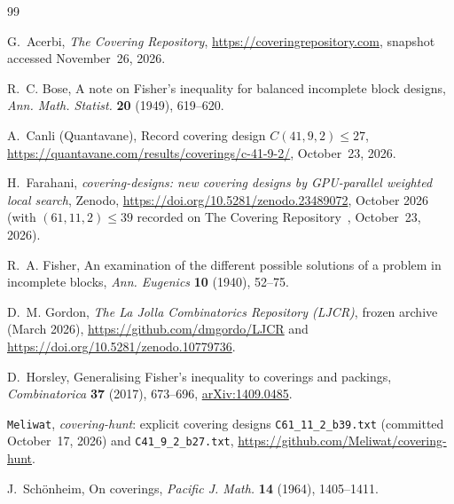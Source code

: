 \documentclass[11pt,a4paper]{article}
\theoremstyle{definition}
\theoremstyle{remark}
\begin{document}
\begin{thebibliography}{99}

G.~Acerbi, \emph{The Covering Repository}, \url{https://coveringrepository.com}, snapshot accessed November~26, 2026.

R.~C. Bose, A note on Fisher's inequality for balanced incomplete block designs, \emph{Ann. Math. Statist.} \textbf{20} (1949), 619--620.

A.~Canli (Quantavane), Record covering design $C(41,9,2) \le 27$, \url{https://quantavane.com/results/coverings/c-41-9-2/}, October~23, 2026.

H.~Farahani, \emph{covering-designs: new covering designs by GPU-parallel weighted local search}, Zenodo, \url{https://doi.org/10.5281/zenodo.23489072}, October 2026 (with $(61,11,2) \le 39$ recorded on The Covering Repository~\cite{AcerbiCR}, October~23, 2026).

R.~A. Fisher, An examination of the different possible solutions of a problem in incomplete blocks, \emph{Ann. Eugenics} \textbf{10} (1940), 52--75.

D.~M. Gordon, \emph{The La Jolla Combinatorics Repository (LJCR)}, frozen archive (March 2026), \url{https://github.com/dmgordo/LJCR} and \url{https://doi.org/10.5281/zenodo.10779736}.

D.~Horsley, Generalising Fisher's inequality to coverings and packings, \emph{Combinatorica} \textbf{37} (2017), 673--696, \href{https://arxiv.org/abs/1409.0485}{arXiv:1409.0485}.

\texttt{Meliwat}, \emph{covering-hunt}: explicit covering designs \texttt{C61\_11\_2\_b39.txt} (committed October~17, 2026) and \texttt{C41\_9\_2\_b27.txt}, \url{https://github.com/Meliwat/covering-hunt}.

J.~Sch\"onheim, On coverings, \emph{Pacific J. Math.} \textbf{14} (1964), 1405--1411.

\end{thebibliography}
\end{document}
